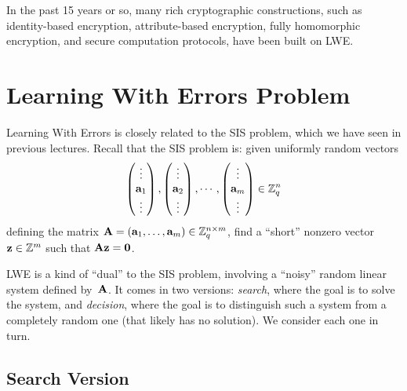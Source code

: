 \documentclass[11pt]{article}
\begin{document}
In the past 15 years or so, many rich cryptographic constructions,
such as identity-based encryption, attribute-based encryption, fully
homomorphic encryption, and secure computation protocols, have been
built on LWE.

\section{Learning With Errors Problem}
\label{sec:learning-with-errors}

Learning With Errors is closely related to the SIS problem, which we
have seen in previous lectures. Recall that the SIS problem is: given
uniformly random vectors
\begin{align*}
  \begin{pmatrix}
    \vdots \\
    \mathbf{a}_1 \\
    \vdots
  \end{pmatrix},
  \begin{pmatrix}
    \vdots \\
    \mathbf{a}_2 \\
    \vdots
  \end{pmatrix},\cdots,
  \begin{pmatrix}
    \vdots \\
    \mathbf{a}_m \\
    \vdots
  \end{pmatrix} \in \mathbb{Z}_q^{n}
\end{align*}
defining the matrix
$\mathbf{A} = (\mathbf{a}_{1}, \ldots, \mathbf{a}_{m}) \in \mathbb{Z}_q^{n \times m}$, find a
``short'' nonzero vector $\mathbf{z} \in \mathbb{Z}^m$ such that
$\mathbf{A} \mathbf{z} = \mathbf{0}$.

LWE is a kind of ``dual'' to the SIS problem, involving a ``noisy''
random linear system defined by~$\mathbf{A}$. It comes in two versions:
\emph{search}, where the goal is to solve the system, and
\emph{decision}, where the goal is to distinguish such a system from a
completely random one (that likely has no solution). We consider each
one in turn.

\subsection{Search Version}
\label{sec:search}
\end{document}
